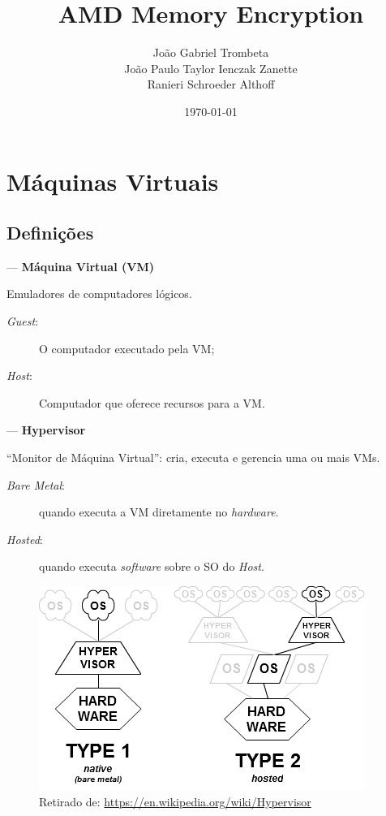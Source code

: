 \documentclass{beamer}
\title{AMD Memory Encryption}
\author{João Gabriel Trombeta\\
        João Paulo Taylor Ienczak Zanette\\
        Ranieri Schroeder Althoff}
\date{\today}
\newcommand{\source}[1]{\caption*{\tiny Retirado de: {#1}} }
\newcommand{\innertitle}[1]{\textbf{\large {#1}}}
\begin{document}
\maketitle{}

\section{Máquinas Virtuais}

\subsection{Definições}

\begin{frame}{\secname{} --- \subsecname}
    \innertitle{Máquina Virtual (VM)}

    Emuladores de computadores lógicos.
    \begin{description}
        \item[\textit{Guest}:] O computador executado pela VM\@;
        \item[\textit{Host}:] Computador que oferece recursos para a VM\@.
    \end{description}
\end{frame}

\begin{frame}{\secname{} --- \subsecname}
    \innertitle{Hypervisor}

    ``Monitor de Máquina Virtual'': cria, executa e gerencia uma ou mais VMs\@.

    \begin{description}
        \item[\textit{Bare Metal}:] quando executa a VM diretamente no
            \textit{hardware}.
        \item[\textit{Hosted}:] quando executa \textit{software} sobre o SO do
            \textit{Host}.
    \end{description}

    \begin{figure}[h]
        \centering
        \includegraphics[keepaspectratio,width=.5\textwidth]{img/hypervisor}
        \source{\url{https://en.wikipedia.org/wiki/Hypervisor}}
    \end{figure}
\end{frame}
\end{document}
